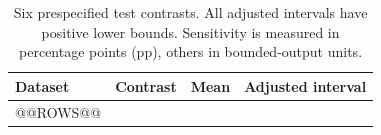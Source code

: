\begin{table}[!htbp]\centering\small
\caption{Six prespecified test contrasts. All adjusted intervals have positive lower bounds. Sensitivity is measured in percentage points (pp), others in bounded-output units.}\label{tab:test-primary}
\begin{tabular}{llrr}\toprule Dataset & Contrast & Mean & Adjusted interval \\\midrule
@@ROWS@@
\bottomrule\end{tabular}\end{table}